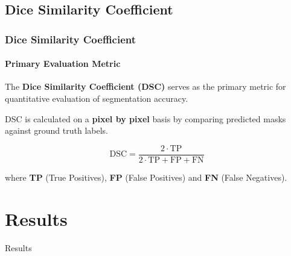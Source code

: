 \documentclass[nometaot,lecture,amberg,toc=twocolumn,indicatelastpageofframe,footlinebox]{OTHAWbeamer}
\begin{document}
\subsection{Dice Similarity Coefficient}
\begin{frame}
    \frametitle{Dice Similarity Coefficient}
    \framesubtitle{Primary Evaluation Metric}

    The \textcolor{orange1}{\textbf{Dice Similarity Coefficient (DSC)}} serves as
    the primary metric for quantitative evaluation of segmentation accuracy.

    \vspace{0.7em}

    DSC is calculated on a \textbf{pixel by pixel} basis by comparing predicted
    masks against ground truth labels.

    \vspace{0.7em}

    \[\displaystyle
        \text{DSC} = \frac{2 \cdot \text{TP}}{2 \cdot \text{TP} + \text{FP} + \text{FN}}
    \]

    \vspace{0.4em}

    where \textbf{TP} (True Positives), \textbf{FP} (False Positives) and
    \textbf{FN} (False Negatives).

\end{frame}

\section{Results}
\begin{breakframe}
    Results
\end{breakframe}


\end{document}
